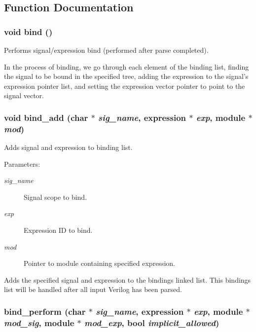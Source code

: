 \subsection{Function Documentation}
\subsubsection{\setlength{\rightskip}{0pt plus 5cm}void bind ()}\label{binding_8c_a8}


Performs signal/expression bind (performed after parse completed). 

In the process of binding, we go through each element of the binding list, finding the signal to be bound in the specified tree, adding the expression to the signal's expression pointer list, and setting the expression vector pointer to point to the signal vector. 
\subsubsection{\setlength{\rightskip}{0pt plus 5cm}void bind\_\-add (char $\ast$ {\em sig\_\-name}, {\bf expression} $\ast$ {\em exp}, {\bf module} $\ast$ {\em mod})}\label{binding_8c_a5}


Adds signal and expression to binding list. 

\begin{Desc}
\item[Parameters:]
\begin{description}
\item[{\em sig\_\-name}]Signal scope to bind. \item[{\em exp}]Expression ID to bind. \item[{\em mod}]Pointer to module containing specified expression.\end{description}
\end{Desc}
Adds the specified signal and expression to the bindings linked list. This bindings list will be handled after all input Verilog has been parsed. 
\subsubsection{ bind\_\-perform (char $\ast$ {\em sig\_\-name}, {\bf expression} $\ast$ {\em exp}, {\bf module} $\ast$ {\em mod\_\-sig}, {\bf module} $\ast$ {\em mod\_\-exp}, {\bf bool} {\em implicit\_\-allowed})}\label{binding_8c_a7}


